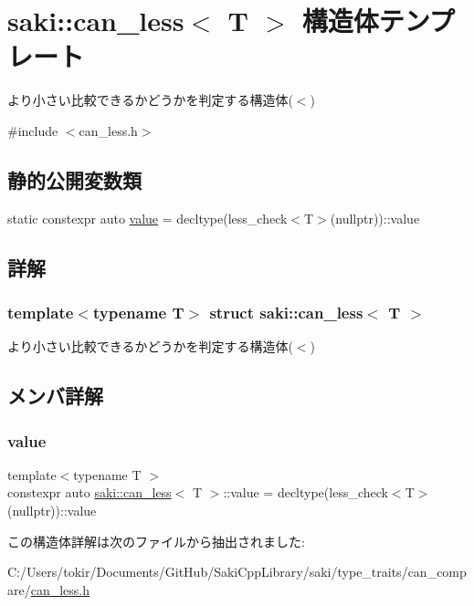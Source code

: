 \hypertarget{structsaki_1_1can__less}{}\section{saki\+:\+:can\+\_\+less$<$ T $>$ 構造体テンプレート}
\label{structsaki_1_1can__less}


より小さい比較できるかどうかを判定する構造体($<$)  




{\ttfamily \#include $<$can\+\_\+less.\+h$>$}

\subsection*{静的公開変数類}
\begin{DoxyCompactItemize}
\item 
static constexpr auto \mbox{\hyperlink{structsaki_1_1can__less_a49490d61ea0770eaf912571ff7219b29}{value}} = decltype(less\+\_\+check$<$T$>$(nullptr))\+::value
\end{DoxyCompactItemize}


\subsection{詳解}
\subsubsection*{template$<$typename T$>$\newline
struct saki\+::can\+\_\+less$<$ T $>$}

より小さい比較できるかどうかを判定する構造体($<$) 

\subsection{メンバ詳解}
\mbox{\label{structsaki_1_1can__less_a49490d61ea0770eaf912571ff7219b29}} 
\subsubsection{\texorpdfstring{value}{value}}
{\footnotesize\ttfamily template$<$typename T $>$ \\
constexpr auto \mbox{\hyperlink{structsaki_1_1can__less}{saki\+::can\+\_\+less}}$<$ T $>$\+::value = decltype(less\+\_\+check$<$T$>$(nullptr))\+::value\hspace{0.3cm}{\ttfamily [static]}}



この構造体詳解は次のファイルから抽出されました\+:\begin{DoxyCompactItemize}
\item 
C\+:/\+Users/tokir/\+Documents/\+Git\+Hub/\+Saki\+Cpp\+Library/saki/type\+\_\+traits/can\+\_\+compare/\mbox{\hyperlink{can__less_8h}{can\+\_\+less.\+h}}\end{DoxyCompactItemize}
